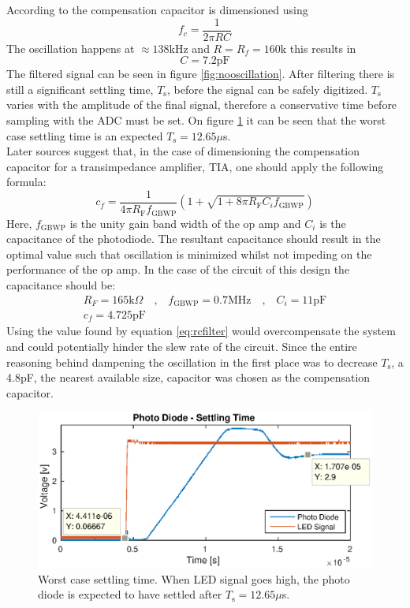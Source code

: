  According to \cite{mec} the compensation capacitor is dimensioned using
\begin{equation}
	\label{eq:rcfilter}
	f_c=\frac{1}{2\pi R C}
\end{equation}
The oscillation happens at $\approx 138\text{kHz}$ and $R = R_f = 160\text{k}$ this results in 
$$C = 7.2\text{pF}$$ 
The filtered signal can be seen in figure \ref{fig:nooscillation}. After filtering there is still a significant settling time, $T_{\text{s}}$, before the signal can be safely digitized. $T_{\text{s}}$ varies with the amplitude of the final signal, therefore a conservative time before sampling with the ADC must be set. 
On figure \ref{fig:settletime} it can be seen that the worst case settling time is an expected $T_{\text{s}}=12.65\mu$s.
\\
Later sources \cite{maxim} suggest that, in the case of dimensioning the compensation capacitor for a transimpedance amplifier, TIA, one should apply the following formula:
\begin{equation}
	c_f=\frac{1}{4\pi R_\text{F}f_\text{GBWP}}(1+\sqrt{1+8\pi R_\text{F}C_if_\text{GBWP}})
\end{equation}
Here, $f_\text{GBWP}$ is the unity gain band width of the op amp and $C_i$ is the capacitance of the photodiode. 
The resultant capacitance should result in the optimal value such that oscillation is minimized whilst not impeding on the performance of the op amp. In the case of the circuit of this design the capacitance should be:
\begin{gather}
	R_F = 165\text{k}\Omega \quad \text{,} \quad f_\text{GBWP}=0.7\text{MHz} \quad \text{,} \quad C_i=11\text{pF}\\
	c_f = 4.725 \text{pF}
\end{gather}
Using the value found by equation \ref{eq:rcfilter} would overcompensate the system and could potentially hinder the slew rate of the circuit. Since the entire reasoning behind dampening the oscillation in the first place was to decrease $T_\text{s}$, a 4.8pF, the nearest available size, capacitor was chosen as the compensation capacitor.  
\begin{figure}[h!]
	\includegraphics[width=\linewidth]{images/settle}
	\caption{Worst case settling time. When LED signal goes high, the photo diode is expected to have settled after $T_{\text{s}}=12.65\mu$s.}
	\label{fig:settletime}
\end{figure}

